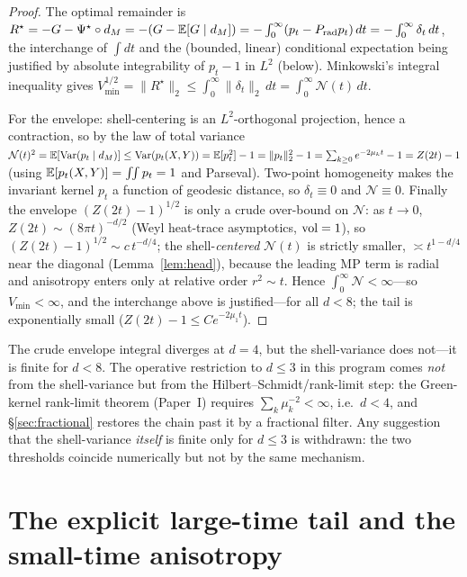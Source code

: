 \begin{proof}
The optimal remainder is $R^\star=-G-\Psi^\star\circ d_M=-(G-\mathbb E[G\mid d_M])
=-\int_0^\infty(p_t-P_{\mathrm{rad}}p_t)\,dt=-\int_0^\infty\delta_t\,dt$, the interchange of
$\int dt$ and the (bounded, linear) conditional expectation being justified by absolute
integrability of $p_t-1$ in $L^2$ (below). Minkowski's integral inequality gives
$V_{\min}^{1/2}=\lVert R^\star\rVert_2\le\int_0^\infty\lVert\delta_t\rVert_2\,dt
=\int_0^\infty\mathcal N(t)\,dt$.

For the envelope: shell-centering is an $L^2$-orthogonal projection, hence a contraction, so
by the law of total variance $\mathcal N(t)^2=\mathbb E[\operatorname{Var}(p_t\mid d_M)]\le\operatorname{Var}(p_t(X,Y))
=\mathbb E[p_t^2]-1=\lVert p_t\rVert_2^2-1=\sum_{k\ge0}e^{-2\mu_k t}-1=Z(2t)-1$ (using
$\mathbb E[p_t(X,Y)]=\int\!\!\int p_t=1$ and Parseval). Two-point homogeneity makes the invariant
kernel $p_t$ a function of geodesic distance, so $\delta_t\equiv0$ and $\mathcal N\equiv0$.
Finally the envelope $(Z(2t)-1)^{1/2}$ is only a crude over-bound on $\mathcal N$: as
$t\to0$, $Z(2t)\sim(8\pi t)^{-d/2}$ (Weyl heat-trace asymptotics, $\operatorname{vol}=1$), so
$(Z(2t)-1)^{1/2}\sim c\,t^{-d/4}$; the shell-\emph{centered} $\mathcal N(t)$ is strictly
smaller, $\asymp t^{1-d/4}$ near the diagonal (Lemma~\ref{lem:head}), because the leading MP
term is radial and anisotropy enters only at relative order $r^2\sim t$. Hence
$\int_0^\infty\mathcal N<\infty$---so $V_{\min}<\infty$, and the interchange above is
justified---for all $d<8$; the tail is exponentially small ($Z(2t)-1\le Ce^{-2\mu_1 t}$).
\end{proof}

\begin{remark}[The genuine role of $d=4$]\label{rem:d4}
The crude envelope integral diverges at $d=4$, but the shell-variance does not---it is finite
for $d<8$. The operative restriction to $d\le3$ in this program comes \emph{not} from the
shell-variance but from the Hilbert--Schmidt/rank-limit step: the Green-kernel rank-limit
theorem (Paper~I) requires $\sum_k\mu_k^{-2}<\infty$, i.e.\ $d<4$, and \S\ref{sec:fractional}
restores the chain past it by a fractional filter. Any suggestion that the shell-variance
\emph{itself} is finite only for $d\le3$ is withdrawn: the two thresholds coincide
numerically but not by the same mechanism.
\end{remark}

\section{The explicit large-time tail and the small-time anisotropy}

